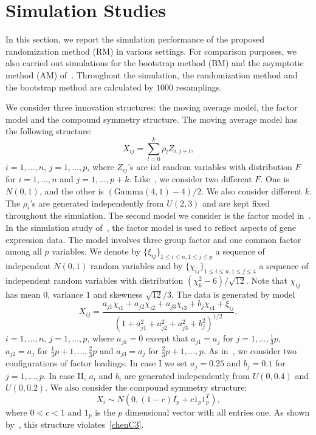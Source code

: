 \documentclass[3p]{elsarticle}
\DeclareMathOperator{\mytr}{tr}
\theoremstyle{plain}
\theoremstyle{definition}
\theoremstyle{remark}
\begin{document}
\section{Simulation Studies}

In this section, we report the simulation performance of the proposed randomization method (RM) in various settings.
For comparison purposes, we also carried out simulations for the bootstrap method (BM) and the asymptotic method (AM) of~\citet{Chen2010A}.
Throughout the simulation, the randomization method and the bootstrap method are calculated by $1000$ resamplings.

We consider three innovation structures: the moving average model, the factor model and the compound symmetry structure.
The moving average model has the following structure:
    \begin{equation*}
    X_{ij}=\sum_{l=0}^k \rho_{l}Z_{i,j+l},
    \end{equation*}
$i=1,\ldots, n$, $j=1,\ldots, p$, where $Z_{ij}$'s are iid random variables with distribution $F$ for $i=1,\ldots, n$ and $j=1,\ldots, p+k$. 
Like~\citet{Chen2010A}, we consider two different $F$.
One is $N(0,1)$, and the other is $(\textrm{Gamma}(4,1)-4)/2$.
We also consider different $k$.
The $\rho_i$'s are generated independently from $U(2,3)$ and are kept fixed throughout the simulation.
The second model we consider is the factor model in~\citet{fan2007to}.
In the simulation study of~\citet{fan2007to}, the factor model is used to reflect aspects of gene expression data.
The model involves three group factor and one common factor among all $p$ variables. 
We denote by $\{\xi_{ij}\}_{1\leq i\leq n, 1\leq j\leq p}$ a sequence of independent $N(0,1)$ random variables and by $\{\chi_{ij}\}_{1\leq i \leq n, 1\leq j \leq 4}$ a sequence of independent random variables with distribution $(\chi_{6}^2-6)/\sqrt{12}$.
Note that $\chi_{ij}$ has mean $0$, variance $1$ and skewness $\sqrt{12}/3$.
The data is generated by model
\begin{equation*}
    X_{ij}=\frac{a_{j1}\chi_{i1}+a_{j2}\chi_{i2}+a_{j3}\chi_{i3}+b_{j}\chi_{i4}+\xi_{ij}}{{(1+a_{j1}^2+a_{j2}^2+a_{j3}^2+b_j^2)}^{1/2}},
\end{equation*}
$i=1,\ldots, n$, $j=1,\ldots, p$,
where $a_{jk}=0$ except that $a_{j1}=a_j$ for $j=1,\ldots,\frac{1}{3}p$, $a_{j2}=a_j$ for $\frac{1}{3}p+1,\ldots,\frac{2}{3}p$ and $a_{j3}=a_j$ for $\frac{2}{3}p+1,\ldots,p$.
As in~\citet{fan2007to}, we consider two configurations of factor loadings. In  case I we set $a_j=0.25$ and $b_j=0.1$ for $j=1,\ldots, p$. In case II, $a_i$ and $b_i$ are generated independently from $U(0,0.4)$ and $U(0,0.2)$.
We also consider the compound symmetry structure:
$$X_i\sim N(0,(1-c)I_p+c 1_{p}1_{p}^T),$$
where $0<c<1$ and $1_{p}$ is the $p$ dimensional vector with all entries one.
As shown by~\cite{KATAYAMA2013410}, this structure violates~\eqref{chenC3}. 
\end{document}
